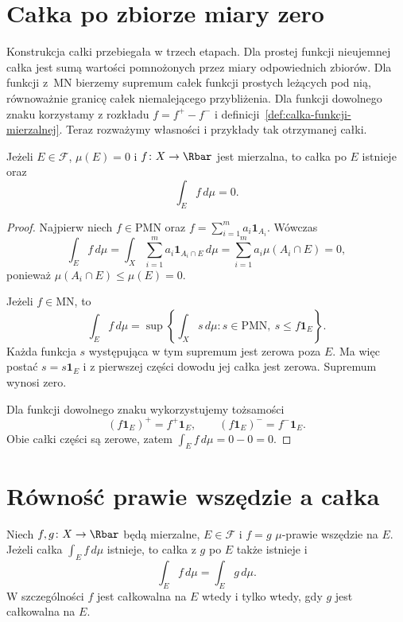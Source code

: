 
\section{Całka po zbiorze miary zero}
\label{sec:calka-po-zbiorze-miary-zero}

Konstrukcja całki przebiegała w trzech etapach. Dla prostej funkcji
nieujemnej całka jest sumą wartości pomnożonych przez miary odpowiednich
zbiorów. Dla funkcji z~$\mathrm{MN}$ bierzemy supremum całek funkcji
prostych leżących pod nią, równoważnie granicę całek niemalejącego
przybliżenia. Dla funkcji dowolnego znaku korzystamy z rozkładu
$f=f^+-f^-$ i definicji~\ref{def:calka-funkcji-mierzalnej}.
Teraz rozważymy własności i przykłady tak otrzymanej całki.

\begin{twierdzenie}
\label{tw:calka-po-zbiorze-miary-zero}
Jeżeli $E\in\mathcal F$, $\mu(E)=0$ i $f\colon X\to\Rbar$ jest
mierzalna, to całka po $E$ istnieje oraz
\[
  \int_E f\,d\mu=0.
\]
\end{twierdzenie}

\begin{proof}
Najpierw niech $f\in\mathrm{PMN}$ oraz
$f=\sum_{i=1}^{m}a_i\mathbf{1}_{A_i}$. Wówczas
\[
  \int_E f\,d\mu
  =\int_X\sum_{i=1}^{m}a_i\mathbf{1}_{A_i\cap E}\,d\mu
  =\sum_{i=1}^{m}a_i\mu(A_i\cap E)=0,
\]
ponieważ $\mu(A_i\cap E)\leq\mu(E)=0$.

Jeżeli $f\in\mathrm{MN}$, to
\[
  \int_E f\,d\mu
  =\sup\left\{\int_X s\,d\mu:
         s\in\mathrm{PMN},\ s\leq f\mathbf{1}_E\right\}.
\]
Każda funkcja $s$ występująca w tym supremum jest zerowa poza $E$.
Ma więc postać $s=s\mathbf{1}_E$ i z pierwszej części dowodu jej
całka jest zerowa. Supremum wynosi zero.

Dla funkcji dowolnego znaku wykorzystujemy tożsamości
\[
  (f\mathbf{1}_E)^+=f^+\mathbf{1}_E,\qquad
  (f\mathbf{1}_E)^-=f^-\mathbf{1}_E.
\]
Obie całki części są zerowe,
zatem $\int_E f\,d\mu=0-0=0$.
\end{proof}

\section{Równość prawie wszędzie a całka}
\label{sec:calka-a-rownosc-prawie-wszedzie}

\begin{twierdzenie}
\label{tw:calka-funkcji-rownych-prawie-wszedzie}
Niech $f,g\colon X\to\Rbar$ będą mierzalne, $E\in\mathcal F$
i $f=g$ $\mu$-prawie wszędzie na $E$. Jeżeli całka
$\int_E f\,d\mu$ istnieje, to całka z $g$ po $E$ także istnieje i
\[
  \int_E f\,d\mu=\int_E g\,d\mu.
\]
W szczególności $f$ jest całkowalna na $E$ wtedy i tylko wtedy,
gdy $g$ jest całkowalna na $E$.
\end{twierdzenie}

